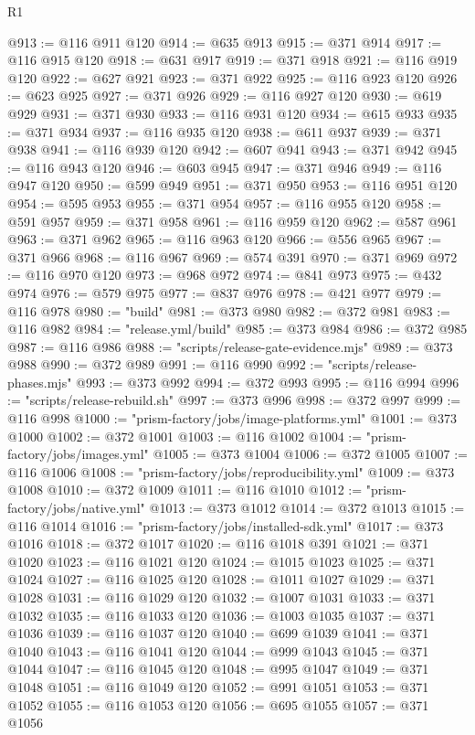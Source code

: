 \begin{lexlean}{R1}
\begin{coremodule}
@913 := @116 @911 @120
@914 := @635 @913
@915 := @371 @914
@917 := @116 @915 @120
@918 := @631 @917
@919 := @371 @918
@921 := @116 @919 @120
@922 := @627 @921
@923 := @371 @922
@925 := @116 @923 @120
@926 := @623 @925
@927 := @371 @926
@929 := @116 @927 @120
@930 := @619 @929
@931 := @371 @930
@933 := @116 @931 @120
@934 := @615 @933
@935 := @371 @934
@937 := @116 @935 @120
@938 := @611 @937
@939 := @371 @938
@941 := @116 @939 @120
@942 := @607 @941
@943 := @371 @942
@945 := @116 @943 @120
@946 := @603 @945
@947 := @371 @946
@949 := @116 @947 @120
@950 := @599 @949
@951 := @371 @950
@953 := @116 @951 @120
@954 := @595 @953
@955 := @371 @954
@957 := @116 @955 @120
@958 := @591 @957
@959 := @371 @958
@961 := @116 @959 @120
@962 := @587 @961
@963 := @371 @962
@965 := @116 @963 @120
@966 := @556 @965
@967 := @371 @966
@968 := @116 @967
@969 := @574 @391
@970 := @371 @969
@972 := @116 @970 @120
@973 := @968 @972
@974 := @841 @973
@975 := @432 @974
@976 := @579 @975
@977 := @837 @976
@978 := @421 @977
@979 := @116 @978
@980 := "build"
@981 := @373 @980
@982 := @372 @981
@983 := @116 @982
@984 := "release.yml/build"
@985 := @373 @984
@986 := @372 @985
@987 := @116 @986
@988 := "scripts/release-gate-evidence.mjs"
@989 := @373 @988
@990 := @372 @989
@991 := @116 @990
@992 := "scripts/release-phases.mjs"
@993 := @373 @992
@994 := @372 @993
@995 := @116 @994
@996 := "scripts/release-rebuild.sh"
@997 := @373 @996
@998 := @372 @997
@999 := @116 @998
@1000 := "prism-factory/jobs/image-platforms.yml"
@1001 := @373 @1000
@1002 := @372 @1001
@1003 := @116 @1002
@1004 := "prism-factory/jobs/images.yml"
@1005 := @373 @1004
@1006 := @372 @1005
@1007 := @116 @1006
@1008 := "prism-factory/jobs/reproducibility.yml"
@1009 := @373 @1008
@1010 := @372 @1009
@1011 := @116 @1010
@1012 := "prism-factory/jobs/native.yml"
@1013 := @373 @1012
@1014 := @372 @1013
@1015 := @116 @1014
@1016 := "prism-factory/jobs/installed-sdk.yml"
@1017 := @373 @1016
@1018 := @372 @1017
@1020 := @116 @1018 @391
@1021 := @371 @1020
@1023 := @116 @1021 @120
@1024 := @1015 @1023
@1025 := @371 @1024
@1027 := @116 @1025 @120
@1028 := @1011 @1027
@1029 := @371 @1028
@1031 := @116 @1029 @120
@1032 := @1007 @1031
@1033 := @371 @1032
@1035 := @116 @1033 @120
@1036 := @1003 @1035
@1037 := @371 @1036
@1039 := @116 @1037 @120
@1040 := @699 @1039
@1041 := @371 @1040
@1043 := @116 @1041 @120
@1044 := @999 @1043
@1045 := @371 @1044
@1047 := @116 @1045 @120
@1048 := @995 @1047
@1049 := @371 @1048
@1051 := @116 @1049 @120
@1052 := @991 @1051
@1053 := @371 @1052
@1055 := @116 @1053 @120
@1056 := @695 @1055
@1057 := @371 @1056

\end{coremodule}
\end{lexlean}
